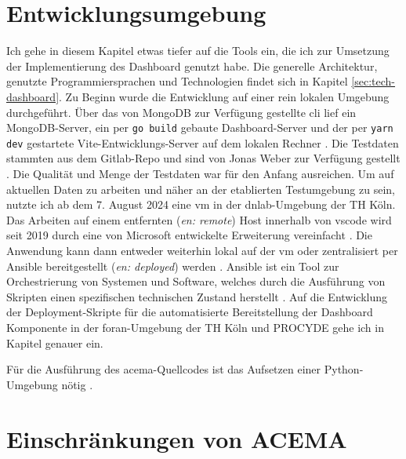 \section{Entwicklungsumgebung}
\label{sec:Entwicklungsumgebung}
Ich gehe in diesem Kapitel etwas tiefer auf die Tools ein, die ich zur Umsetzung der Implementierung des Dashboard genutzt habe. Die generelle Architektur, genutzte Programmiersprachen und Technologien findet sich in Kapitel \ref{sec:tech-dashboard}. Zu Beginn wurde die Entwicklung auf einer rein lokalen Umgebung durchgeführt. Über das von MongoDB zur Verfügung gestellte \gls{cli} lief ein MongoDB-Server, ein per \verb|go build| gebaute Dashboard-Server und der per \verb|yarn dev| gestartete Vite-Entwicklungs-Server auf dem lokalen Rechner \autocite{MongoDBDeveloperData} \autocite{Vite}. Die Testdaten stammten aus dem Gitlab-Repo und sind von Jonas Weber zur Verfügung gestellt \autocite{AddExampleData2023}. Die Qualität und Menge der Testdaten war für den Anfang ausreichen. Um auf aktuellen Daten zu arbeiten und näher an der etablierten Testumgebung zu sein, nutzte ich ab dem 7. August 2024 eine \gls{vm} in der \glqq\gls{dnlab}\grqq-Umgebung der TH Köln. Das Arbeiten auf einem entfernten (\textit{en: remote}) Host innerhalb von \gls{vscode} wird seit 2019 durch eine von Microsoft entwickelte Erweiterung vereinfacht \autocite{RemoteSSHVisual}. Die Anwendung kann dann entweder weiterhin lokal auf der \gls{vm} oder zentralisiert per Ansible bereitgestellt (\textit{en: deployed}) werden \autocite{HomepageAnsibleCollaborative}. Ansible ist ein Tool zur Orchestrierung von Systemen und Software, welches durch die Ausführung von Skripten einen spezifischen technischen Zustand herstellt \autocite{alHowAnsibleWorks2024}. Auf die Entwicklung der Deployment-Skripte für die automatisierte Bereitstellung der Dashboard Komponente in der \gls{foran}-Umgebung der TH Köln und PROCYDE gehe ich in Kapitel  genauer ein.
\par Für die Ausführung des \gls{acema}-Quellcodes ist das Aufsetzen einer Python-Umgebung nötig \autocite{FklementAcema_oranCode} \autocite{WelcomePythonorg}.
\section[Einschränkungen]{Einschränkungen von ACEMA}
\label{sec:einschränkungen}